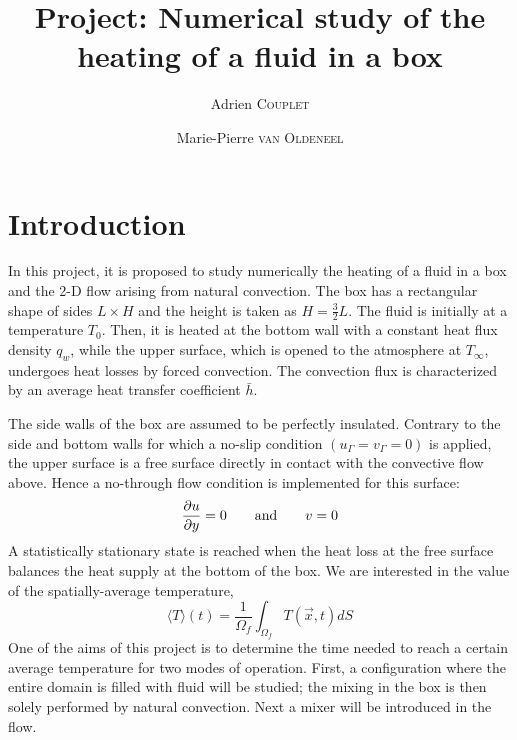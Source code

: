 \documentclass[a4paper,10pt]{scrartcl}
\title{Project: Numerical study of the heating of a fluid in a box}
\author{Adrien \textsc{Couplet} \and Marie-Pierre \textsc{van Oldeneel}}
\newcommand\partiald[3]{\frac{\partial\ifnum#1>1 ^{#1}\fi #2}{\partial #3\ifnum#1>1 ^{#1}\fi}}
\begin{document}
\maketitle
\section{Introduction}
In this project, it is proposed to study numerically the heating of a fluid in a box and the 2-D flow arising from natural convection. The box has a rectangular shape of sides $L\times H$ and the height is taken as $H=\frac{3}{2}L$. The fluid is initially at a temperature $T_0$. Then, it is heated at the bottom wall with a constant heat flux density $q_w$, while the upper surface, which is opened to the atmosphere at $T_\infty$, undergoes heat losses by forced convection. The convection flux is characterized by an average heat transfer coefficient $\bar{h}$.

The side walls of the box are assumed to be perfectly insulated. Contrary to the side and bottom walls for which a no-slip condition $(u_\Gamma = v_\Gamma=0)$ is applied, the upper surface is a free surface directly in contact with the convective flow above. Hence a no-through flow condition is implemented for this surface:
\begin{equation} \partiald{1}{u}{y} = 0 \qquad\text{and}\qquad v=0 \end{equation}
A statistically stationary state is reached when the heat loss at the free surface balances the heat supply at the bottom of the box. We are interested in the value of the spatially-average temperature,
\begin{equation} \langle T\rangle(t) = \frac{1}{\Omega_f}\int_{\Omega_f}T(\vec{x},t)dS \end{equation}
One of the aims of this project is to determine the time needed to reach a certain average temperature for two modes of operation. First, a configuration where the entire domain is filled with fluid will be studied; the mixing in the box is then solely performed by natural convection. Next a mixer will be introduced in the flow.
\end{document}
